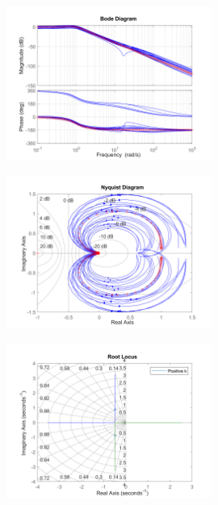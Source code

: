 \documentclass{article}
\begin{document}
\begin{figure}[H]
    \centering
    \includegraphics[width=0.6\textwidth]{figures/bode_G.png}
    \caption{}
    \label{fig:bode_G}
\end{figure}

\begin{figure}[H]
    \centering
    \includegraphics[width=0.6\textwidth]{figures/nyquist_G.png}
    \caption{}
    \label{fig:nyquist_G}
\end{figure}

\begin{figure}[H]
    \centering
    \includegraphics[width=0.6\textwidth]{figures/rlocus_G.png}
    \caption{}
    \label{fig:rlocus_G}
\end{figure}
\end{document}
